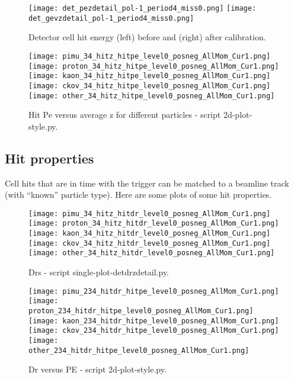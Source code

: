  \begin{figure}	   
 \centering
  \texttt{[image: det\_pezdetail\_pol-1\_period4\_miss0.png]}
   \texttt{[image: det\_gevzdetail\_pol-1\_period4\_miss0.png]}
  \caption{Detector cell hit energy (left) before and (right) after calibration.}			
   \label{fig_detenergyz}
  \end{figure}
%  

   \begin{figure}	   
 \centering
  \texttt{[image: pimu\_34\_hitz\_hitpe\_level0\_posneg\_AllMom\_Cur1.png]}
   \texttt{[image: proton\_34\_hitz\_hitpe\_level0\_posneg\_AllMom\_Cur1.png]}
     \texttt{[image: kaon\_34\_hitz\_hitpe\_level0\_posneg\_AllMom\_Cur1.png]}
   \texttt{[image: ckov\_34\_hitz\_hitpe\_level0\_posneg\_AllMom\_Cur1.png]}
     \texttt{[image: other\_34\_hitz\_hitpe\_level0\_posneg\_AllMom\_Cur1.png]}

  \caption{Hit Pe versus average z for different particles - script 2d-plot-style.py.}			
   \label{fig_pez}
  \end{figure}
%    
\subsection{Hit properties}

Cell hits that are in time with the trigger can be matched to a beamline track (with ``known'' particle type). Here are some plots of some hit properties. 


 \begin{figure}	   
 \centering
  \texttt{[image: pimu\_34\_hitz\_hitdr\_level0\_posneg\_AllMom\_Cur1.png]}
   \texttt{[image: proton\_34\_hitz\_hitdr\_level0\_posneg\_AllMom\_Cur1.png]}
     \texttt{[image: kaon\_34\_hitz\_hitdr\_level0\_posneg\_AllMom\_Cur1.png]}
   \texttt{[image: ckov\_34\_hitz\_hitdr\_level0\_posneg\_AllMom\_Cur1.png]}
     \texttt{[image: other\_34\_hitz\_hitdr\_level0\_posneg\_AllMom\_Cur1.png]}

  \caption{Drs - script single-plot-detdrzdetail.py.}			
   \label{fig_detdrz}
  \end{figure}
  
   \begin{figure}	   
 \centering
  \texttt{[image: pimu\_234\_hitdr\_hitpe\_level0\_posneg\_AllMom\_Cur1.png]}
   \texttt{[image: proton\_234\_hitdr\_hitpe\_level0\_posneg\_AllMom\_Cur1.png]}
     \texttt{[image: kaon\_234\_hitdr\_hitpe\_level0\_posneg\_AllMom\_Cur1.png]}
   \texttt{[image: ckov\_234\_hitdr\_hitpe\_level0\_posneg\_AllMom\_Cur1.png]}
     \texttt{[image: other\_234\_hitdr\_hitpe\_level0\_posneg\_AllMom\_Cur1.png]}

  \caption{Dr versus PE - script 2d-plot-style.py.}			
   \label{fig_detdrpe}
  \end{figure}

